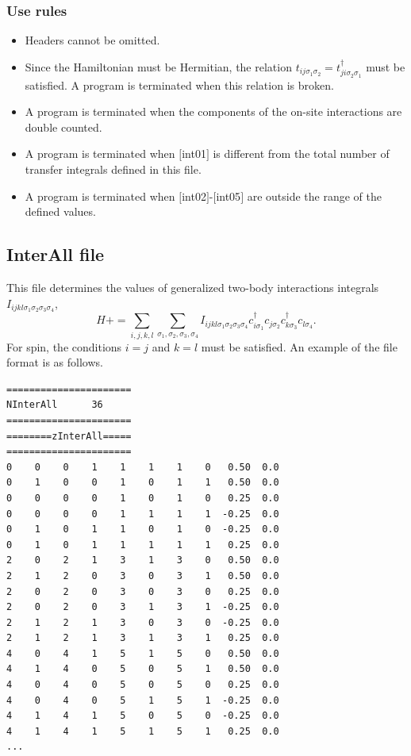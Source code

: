 \subsubsection{Use rules}
\begin{itemize}
\item Headers cannot be omitted. 
\item Since the Hamiltonian must be Hermitian, the relation $t_{ij\sigma_1\sigma_2}=t_{ji\sigma_2\sigma_1}^{\dagger}$ must be satisfied. A program is terminated when this relation is broken.
\item A program is terminated when the components of the on-site interactions are double counted.
\item A program is terminated when $[$int01$]$ is different from the total number of transfer integrals defined in this file.
\item A program is terminated when $[$int02$]$-$[$int05$]$ are outside the range of the defined values.
\end{itemize}

\newpage
\subsection{InterAll file}
\label{Subsec:interall}
This file determines the values of generalized two-body interactions integrals $I_{ijkl\sigma_1\sigma_2\sigma_3\sigma_4}$,
\begin{equation}
H+=\sum_{i,j,k,l}\sum_{\sigma_1,\sigma_2, \sigma_3, \sigma_4}
I_{ijkl\sigma_1\sigma_2\sigma_3\sigma_4}c_{i\sigma_1}^{\dagger}c_{j\sigma_2}c_{k\sigma_3}^{\dagger}c_{l\sigma_4}.
\end{equation}
{For spin, the conditions $i=j$ and $k=l$ must be satisfied.}
An example of the file format is as follows.

\begin{minipage}{12.5cm}
\begin{screen}
\begin{verbatim}
====================== 
NInterAll      36  
====================== 
========zInterAll===== 
====================== 
0    0    0    1    1    1    1    0   0.50  0.0
0    1    0    0    1    0    1    1   0.50  0.0
0    0    0    0    1    0    1    0   0.25  0.0
0    0    0    0    1    1    1    1  -0.25  0.0
0    1    0    1    1    0    1    0  -0.25  0.0
0    1    0    1    1    1    1    1   0.25  0.0
2    0    2    1    3    1    3    0   0.50  0.0
2    1    2    0    3    0    3    1   0.50  0.0
2    0    2    0    3    0    3    0   0.25  0.0
2    0    2    0    3    1    3    1  -0.25  0.0
2    1    2    1    3    0    3    0  -0.25  0.0
2    1    2    1    3    1    3    1   0.25  0.0
4    0    4    1    5    1    5    0   0.50  0.0
4    1    4    0    5    0    5    1   0.50  0.0
4    0    4    0    5    0    5    0   0.25  0.0
4    0    4    0    5    1    5    1  -0.25  0.0
4    1    4    1    5    0    5    0  -0.25  0.0
4    1    4    1    5    1    5    1   0.25  0.0
...
\end{verbatim}
\end{screen}
\end{minipage}

